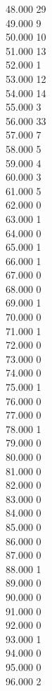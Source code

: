 { 48.000	29 \\
 49.000	9 \\
 50.000	10 \\
 51.000	13 \\
 52.000	1 \\
 53.000	12 \\
 54.000	14 \\
 55.000	3 \\
 56.000	33 \\
 57.000	7 \\
 58.000	5 \\
 59.000	4 \\
 60.000	3 \\
 61.000	5 \\
 62.000	0 \\
 63.000	1 \\
 64.000	0 \\
 65.000	1 \\
 66.000	1 \\
 67.000	0 \\
 68.000	0 \\
 69.000	1 \\
 70.000	0 \\
 71.000	1 \\
 72.000	0 \\
 73.000	0 \\
 74.000	0 \\
 75.000	1 \\
 76.000	0 \\
 77.000	0 \\
 78.000	1 \\
 79.000	0 \\
 80.000	0 \\
 81.000	0 \\
 82.000	0 \\
 83.000	0 \\
 84.000	0 \\
 85.000	0 \\
 86.000	0 \\
 87.000	0 \\
 88.000	1 \\
 89.000	0 \\
 90.000	0 \\
 91.000	0 \\
 92.000	0 \\
 93.000	1 \\
 94.000	0 \\
 95.000	0 \\
 96.000	2 \\
}
